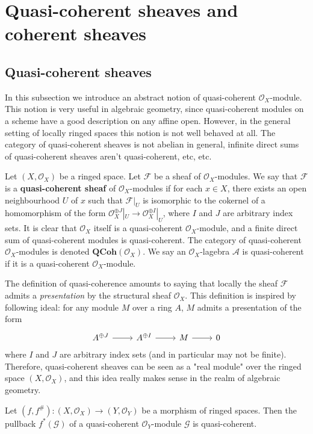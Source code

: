 \section{Quasi-coherent sheaves and coherent sheaves}
\subsection{Quasi-coherent sheaves}
In this subsection we introduce an abstract notion of quasi-coherent $\mathscr{O}_X$-module. This notion is very useful in algebraic geometry, since quasi-coherent modules on a scheme have a good description on any affine open. However, in the general setting of locally ringed spaces this notion is not well behaved at all. The category of quasi-coherent sheaves is not abelian in general, infinite direct sums of quasi-coherent sheaves aren't quasi-coherent, etc, etc.\par
Let $(X,\mathscr{O}_X)$ be a ringed space. Let $\mathscr{F}$ be a sheaf of $\mathscr{O}_X$-modules. We say that $\mathscr{F}$ is a \textbf{quasi-coherent sheaf} of $\mathscr{O}_X$-modules if for each $x\in X$, there exists an open neighbourhood $U$ of $x$ such that $\mathscr{F}|_U$ is isomorphic to the cokernel of a homomorphism of the form $\mathscr{O}_X^{\oplus J}|_U\to\mathscr{O}_X^{\oplus I}|_U$, where $I$ and $J$ are arbitrary index sets. It is clear that $\mathscr{O}_X$ itself is a quasi-coherent $\mathscr{O}_X$-module, and a finite direct sum of quasi-coherent modules is quasi-coherent. The category of quasi-coherent $\mathscr{O}_X$-modules is denoted $\mathbf{QCoh}(\mathscr{O}_X)$. We say an $\mathscr{O}_X$-lagebra $\mathscr{A}$ is quasi-coherent if it is a quasi-coherent $\mathscr{O}_X$-module.\par
The definition of quasi-coherence amounts to saying that locally the sheaf $\mathscr{F}$ admits a \textit{presentation} by the structural sheaf $\mathscr{O}_X$. This definition is inspired by following ideal: for any module $M$ over a ring $A$, $M$ admits a presentation of the form
\[\begin{tikzcd}
A^{\oplus J}\ar[r]&A^{\oplus I}\ar[r]&M\ar[r]&0
\end{tikzcd}\]
where $I$ and $J$ are arbitrary index sets (and in particular may not be finite). Therefore, quasi-coherent sheaves can be seen as a "real module" over the ringed space $(X,\mathscr{O}_X)$, and this idea really makes sense in the realm of algebraic geometry.
\begin{proposition}\label{sheaf of module qcoh under inverse image}
Let $(f,f^{\#}):(X,\mathscr{O}_X)\to(Y,\mathscr{O}_Y)$ be a morphism of ringed spaces. Then the pullback $f^*(\mathscr{G})$ of a quasi-coherent $\mathscr{O}_Y$-module $\mathscr{G}$ is quasi-coherent.
\end{proposition}
